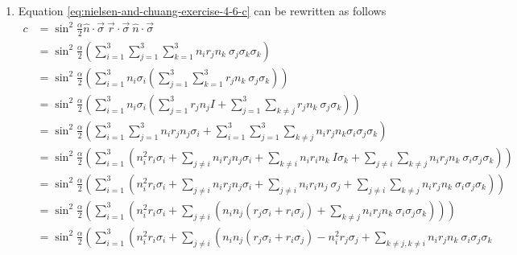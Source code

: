 \begin{enumerate}[label=\alph*)]
    \item Equation \ref{eq:nielsen-and-chuang-exercise-4-6-c} can be rewritten
    as follows
    \begin{align}
        c &= \sin^2\frac{\alpha}{2} \hat{n}\cdot\vec{\sigma}\
            \vec{r}\cdot\vec{\sigma}\ \hat{n}\cdot\vec{\sigma} \\
        &= \sin^2\frac{\alpha}{2} \left(
            \sum_{i = 1}^3\sum_{j = 1}^3\sum_{k = 1}^3
            n_i r_j n_k\ \sigma_j \sigma_k \sigma_k
        \right) \\
        &= \sin^2\frac{\alpha}{2} \left( \sum_{i = 1}^3 n_i \sigma_i \left(
            \sum_{j = 1}^3\sum_{k=1}^3 r_j n_k\ \sigma_j \sigma_k
        \right)\right) \\
        &= \sin^2\frac{\alpha}{2} \left( \sum_{i = 1}^3 n_i \sigma_i \left(
            \sum_{j = 1}^3 r_j n_j I + \sum_{j = 1}^3\sum_{k\neq j} r_j n_k\ \sigma_j \sigma_k
        \right)\right) \\
        &= \sin^2 \frac{\alpha}{2} \left(
            \sum_{i = 1}^3\sum_{j = 1}^3 n_i r_j n_j \sigma_i +
            \sum_{i=1}^3\sum_{j=1}^3\sum_{k \neq j}
                n_i r_j n_k \sigma_i \sigma_j \sigma_k
        \right) \\
        &= \sin^2 \frac{\alpha}{2} \left(
            \sum_{i = 1}^3 \left( n_i^2 r_i \sigma_i +
            \sum_{j \neq i} n_i r_j n_j \sigma_i +
            \sum_{k \neq i} n_i r_i n_k\ I\sigma_k +
            \sum_{j \neq i}\sum_{k \neq j} n_i r_j n_k\ \sigma_i \sigma_j \sigma_k
        \right) \right) \\
        &= \sin^2 \frac{\alpha}{2} \left(
            \sum_{i = 1}^3 \left( n_i^2 r_i \sigma_i +
            \sum_{j \neq i} n_i r_j n_j \sigma_i +
            \sum_{j \neq i} n_i r_i n_j\ \sigma_j +
            \sum_{j \neq i}\sum_{k \neq j} n_i r_j n_k\ \sigma_i \sigma_j \sigma_k
        \right) \right) \\
        &= \sin^2 \frac{\alpha}{2} \left(
            \sum_{i = 1}^3 \left( n_i^2 r_i \sigma_i +
            \sum_{j \neq i} \left(
            n_i n_j (r_j \sigma_i + r_i \sigma_j) +
            \sum_{k \neq j} n_i r_j n_k\ \sigma_i \sigma_j \sigma_k
        \right) \right) \right) \\
        &= \sin^2 \frac{\alpha}{2} \left(
            \sum_{i = 1}^3 \left( n_i^2 r_i \sigma_i +
            \sum_{j \neq i} \left(
            n_i n_j (r_j \sigma_i + r_i \sigma_j) -
            n_i^2 r_j \sigma_j +
            \sum_{k \neq j, k \neq i} n_i r_j n_k\ \sigma_i \sigma_j \sigma_k

\end{align}
\end{enumerate}
